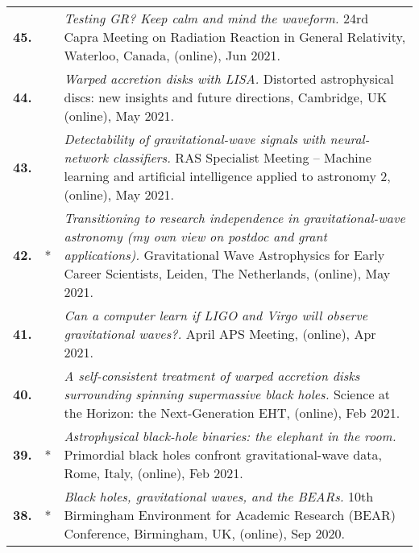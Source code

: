 {\begin{longtable}{rp{0.3cm}p{15.8cm}}
%
\textbf{45.} &  & \textit{Testing GR? Keep calm and mind the waveform.}
\newline{}
24rd Capra Meeting on Radiation Reaction in General Relativity, Waterloo, Canada, (online), Jun 2021.
\vspace{0.05cm}\\
%
\textbf{44.} &  & \textit{Warped accretion disks with LISA.}
\newline{}
Distorted astrophysical discs: new insights and future directions, Cambridge, UK (online), May 2021.
\vspace{0.05cm}\\
%
\textbf{43.} &  & \textit{Detectability of gravitational-wave signals with neural-network classifiers.}
\newline{}
RAS Specialist Meeting -- Machine learning and artificial intelligence applied to astronomy 2, (online), May 2021.
\vspace{0.05cm}\\
%
\textbf{42.} & * & \textit{Transitioning to research independence in gravitational-wave astronomy (my own view on postdoc and grant applications).}
\newline{}
Gravitational Wave Astrophysics for Early Career Scientists, Leiden, The Netherlands, (online), May 2021.
\vspace{0.05cm}\\
%
\textbf{41.} &  & \textit{Can a computer learn if LIGO and Virgo will observe gravitational waves?.}
\newline{}
 April APS Meeting, (online), Apr 2021.
\vspace{0.05cm}\\
%
\textbf{40.} &  & \textit{A self-consistent treatment of warped accretion disks surrounding spinning supermassive black holes.}
\newline{}
Science at the Horizon: the Next-Generation EHT, (online), Feb 2021.
\vspace{0.05cm}\\
%
\textbf{39.} & * & \textit{Astrophysical black-hole binaries: the elephant in the room.}
\newline{}
Primordial black holes confront gravitational-wave data, Rome, Italy, (online), Feb 2021.
\vspace{0.05cm}\\
%
\textbf{38.} & * & \textit{Black holes, gravitational waves, and the BEARs.}
\newline{}
10th Birmingham Environment for Academic Research (BEAR) Conference, Birmingham, UK, (online), Sep 2020.

\end{longtable}}
